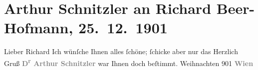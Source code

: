 

         
         \renewcommand{\erwaehntePersonen}{Personen: Richard Beer-Hofmann}
         \renewcommand{\erwaehnteOrte}{Orte: Wien}
         \renewcommand{\erwaehnteWerke}{}
               \section[Arthur Schnitzler an Richard Beer-Hofmann, 25. 12. 1901]{ Arthur Schnitzler an Richard Beer-Hofmann, 25. 12. 1901}\nopagebreak{}\rehead{ }\begin{ledgroupsized}[t]{13cm}\normalsize\beginnumbering{} \toendnotes[C]{\smallbreak\pagebreak[2]} 
\toendnotes[C]{\smallbreak}\pstart\center{}{\pb}Lieber Richard\pend\pstart
           Ich wünſche Ihnen alles ſchöne; ſchicke aber nur das\pend
           \pstart Herzlich Gruß\pend{}\pstart
           \centering{}\textcolor{gray}{\textbf{D\textsuperscript{r} Arthur Schnitzler}}\pend
           \pstart
           \noindent{}\label{K_L01191-1v}\label{K_L01191-1h} war Ihnen doch beſtimmt.\pend
           \pstart
           Weihnachten 901\pend
           \pstart
           \raggedleft{}\textcolor{gray}{\textbf{Wien}}\pend
           
         
         \endnumbering{}\end{ledgroupsized}  \newcommand{\dateiname}{L01191}\newcommand{\titel}{Arthur Schnitzler an Richard Beer-Hofmann, 25. 12. 1901}\newcommand{\editorInnen}{Martin Anton Müller und Gerd-Hermann Susen}
      